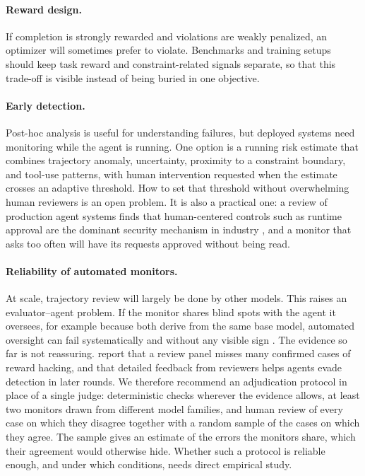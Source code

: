 \documentclass{article}
\begin{document}
\paragraph{Reward design.}
If completion is strongly rewarded and violations are weakly penalized, an optimizer will sometimes prefer to violate. Benchmarks and training setups should keep task reward and constraint-related signals separate, so that this trade-off is visible instead of being buried in one objective.

\paragraph{Early detection.}
Post-hoc analysis is useful for understanding failures, but deployed systems need monitoring while the agent is running. One option is a running risk estimate that combines trajectory anomaly, uncertainty, proximity to a constraint boundary, and tool-use patterns, with human intervention requested when the estimate crosses an adaptive threshold. How to set that threshold without overwhelming human reviewers is an open problem. It is also a practical one: a review of production agent systems finds that human-centered controls such as runtime approval are the dominant security mechanism in industry \citep{wang2026reframing}, and a monitor that asks too often will have its requests approved without being read.

\paragraph{Reliability of automated monitors.}
At scale, trajectory review will largely be done by other models. This raises an evaluator--agent problem. If the monitor shares blind spots with the agent it oversees, for example because both derive from the same base model, automated oversight can fail systematically and without any visible sign \citep{panickssery2024llm,greenblatt2024control}. The evidence so far is not reassuring. \citet{huang2026reward} report that a review panel misses many confirmed cases of reward hacking, and that detailed feedback from reviewers helps agents evade detection in later rounds. We therefore recommend an adjudication protocol in place of a single judge: deterministic checks wherever the evidence allows, at least two monitors drawn from different model families, and human review of every case on which they disagree together with a random sample of the cases on which they agree. The sample gives an estimate of the errors the monitors share, which their agreement would otherwise hide. Whether such a protocol is reliable enough, and under which conditions, needs direct empirical study.
\end{document}
